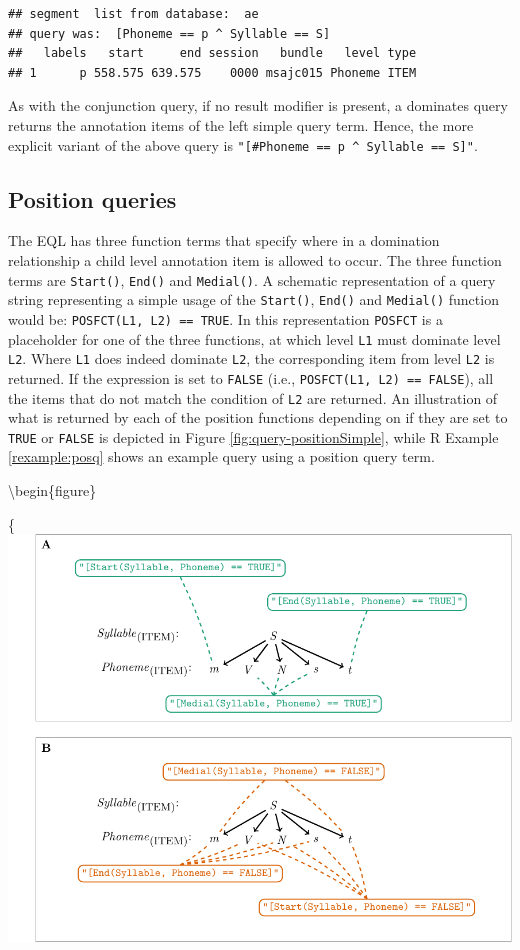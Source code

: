 \documentclass[]{book}
\theoremstyle{definition}
\theoremstyle{definition}
\theoremstyle{definition}
\theoremstyle{remark}
\begin{document}
\begin{verbatim}
## segment  list from database:  ae 
## query was:  [Phoneme == p ^ Syllable == S] 
##   labels   start     end session   bundle   level type
## 1      p 558.575 639.575    0000 msajc015 Phoneme ITEM
\end{verbatim}

As with the conjunction query, if no result modifier is present, a
dominates query returns the annotation items of the left simple query
term. Hence, the more explicit variant of the above query is
\texttt{"{[}\#Phoneme\ ==\ p\ \^{}\ Syllable\ ==\ S{]}"}.

\hypertarget{subsec:query_positionQueries}{%
\subsection{Position queries}\label{subsec:query_positionQueries}}

The EQL has three function terms that specify where in a domination
relationship a child level annotation item is allowed to occur. The
three function terms are \texttt{Start()}, \texttt{End()} and
\texttt{Medial()}. A schematic representation of a query string
representing a simple usage of the \texttt{Start()}, \texttt{End()} and
\texttt{Medial()} function would be: \texttt{POSFCT(L1,\ L2)\ ==\ TRUE}.
In this representation \texttt{POSFCT} is a placeholder for one of the
three functions, at which level \texttt{L1} must dominate level
\texttt{L2}. Where \texttt{L1} does indeed dominate \texttt{L2}, the
corresponding item from level \texttt{L2} is returned. If the expression
is set to \texttt{FALSE} (i.e., \texttt{POSFCT(L1,\ L2)\ ==\ FALSE}),
all the items that do not match the condition of \texttt{L2} are
returned. An illustration of what is returned by each of the position
functions depending on if they are set to \texttt{TRUE} or
\texttt{FALSE} is depicted in Figure \ref{fig:query-positionSimple},
while R Example \ref{rexample:posq} shows an example query using a
position query term.

\textbackslash{}begin\{figure\}

\{\centering \includegraphics[width=0.75\linewidth]{pics/positionSimple}
\end{document}
